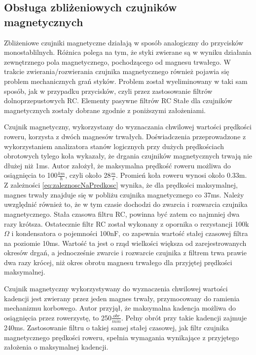 \subsection{Obsługa zbliżeniowych czujników magnetycznych}
Zbliżeniowe czujniki magnetyczne działają w sposób analogiczny do przycisków monostablilnych. Różnica polega na tym, że styki zwierane są w wyniku działania zewnętrznego pola magnetycznego, pochodzącego od magnesu trwałego. W trakcie zwierania/rozwierania czujnika magnetycznego również pojawia się problem mechanicznych grań styków. Problem został wyeliminowany w taki sam sposób, jak w przypadku przycisków, czyli przez zastosowanie filtrów dolnoprzepustowych RC. Elementy pasywne filtrów RC Stałe dla czujników magnetycznych zostały dobrane zgodnie z poniższymi założeniami.

Czujnik magnetyczny, wykorzystany do wyznaczania chwilowej wartości prędkości roweru, korzysta z dwóch magnesów trwałych. Doświadczenia przeprowadzone z wykorzystaniem analizatora stanów logicznych przy dużych prędkościach obrotowych tylego koła wykazały, że drgania czujników magnetycznych trwają nie dłużej niż 1ms.  Autor założył, że maksymalna prędkość roweru możliwa do osiągnięcia to 100$\frac{km}{h}$, czyli około 28$\frac{m}{s}$. Promień koła roweru wynosi około 0.33m. Z zależności \ref{eq:zaleznoscNaPredkosc} wynika, że dla prędkości maksymalnej, magnes trwały znajduje się w pobliżu czujnika magnetycznego co 37ms. Należy uwzględnić również to, że w tym czasie dochodzi do zwarcia i rozwarcia czujnika magnetycznego. Stała czasowa filtru RC, powinna być zatem co najmniej dwa razy krótsza. Ostatecznie filtr RC został wykonany z opornika o rezystancji 100k$\Omega$ i kondensatora o pojemności 100nF, co zapewnia wartość stałej czasowej filtra na poziomie 10ms. Wartość ta jest o rząd wielkości większa od zarejestrowanych okresów drgań, a jednocześnie zwarcie i rozwarcie czujnika z filtrem trwa prawie dwa razy krócej, niż okres obrotu magnesu trwałego dla przyjętej prędkości maksymalnej.

Czujnik magnetyczny wykorzystywany do wyznaczenia chwilowej wartości kadencji jest zwierany przez jeden magnes trwały, przymocowany do ramienia mechanizmu korbowego. Autor przyjął, że maksymalna kadencja możliwa do osiągnięcia przez rowerzystę, to 250$\frac{obr}{min}$. Pełny obrót przy takie kadencji zajmuje 240ms. Zastosowanie filtru o takiej samej stałej czasowej, jak filtr czujnika magnetycznego prędkości roweru, spełnia wymagania wynikające z przyjętego założenia o maksymalnej kadencji. 
